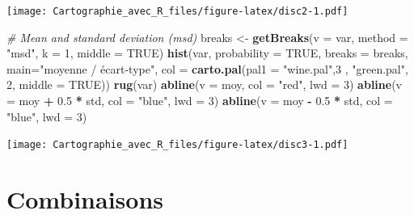 \documentclass[]{book}
\newenvironment{Shaded}{\begin{snugshade}}{\end{snugshade}}
\newcommand{\KeywordTok}[1]{\textcolor[rgb]{0.13,0.29,0.53}{\textbf{#1}}}
\newcommand{\DataTypeTok}[1]{\textcolor[rgb]{0.13,0.29,0.53}{#1}}
\newcommand{\DecValTok}[1]{\textcolor[rgb]{0.00,0.00,0.81}{#1}}
\newcommand{\FloatTok}[1]{\textcolor[rgb]{0.00,0.00,0.81}{#1}}
\newcommand{\StringTok}[1]{\textcolor[rgb]{0.31,0.60,0.02}{#1}}
\newcommand{\CommentTok}[1]{\textcolor[rgb]{0.56,0.35,0.01}{\textit{#1}}}
\newcommand{\OtherTok}[1]{\textcolor[rgb]{0.56,0.35,0.01}{#1}}
\newcommand{\OperatorTok}[1]{\textcolor[rgb]{0.81,0.36,0.00}{\textbf{#1}}}
\newcommand{\NormalTok}[1]{#1}
\begin{document}
\texttt{[image: Cartographie\_avec\_R\_files/figure-latex/disc2-1.pdf]}

\begin{Shaded}
\begin{Highlighting}[]
\CommentTok{# Mean and standard deviation (msd)}
\NormalTok{breaks <-}\StringTok{ }\KeywordTok{getBreaks}\NormalTok{(}\DataTypeTok{v =}\NormalTok{ var, }\DataTypeTok{method =} \StringTok{"msd"}\NormalTok{, }\DataTypeTok{k =} \DecValTok{1}\NormalTok{, }\DataTypeTok{middle =} \OtherTok{TRUE}\NormalTok{)}
\KeywordTok{hist}\NormalTok{(var, }\DataTypeTok{probability =} \OtherTok{TRUE}\NormalTok{, }\DataTypeTok{breaks =}\NormalTok{ breaks, }\DataTypeTok{main=}\StringTok{"moyenne / écart-type"}\NormalTok{,}
     \DataTypeTok{col =} \KeywordTok{carto.pal}\NormalTok{(}\DataTypeTok{pal1 =} \StringTok{"wine.pal"}\NormalTok{,}\DecValTok{3}\NormalTok{ , }\StringTok{"green.pal"}\NormalTok{, }\DecValTok{2}\NormalTok{, }\DataTypeTok{middle =} \OtherTok{TRUE}\NormalTok{))}
\KeywordTok{rug}\NormalTok{(var)}
\KeywordTok{abline}\NormalTok{(}\DataTypeTok{v =}\NormalTok{ moy, }\DataTypeTok{col =} \StringTok{"red"}\NormalTok{, }\DataTypeTok{lwd =} \DecValTok{3}\NormalTok{)}
\KeywordTok{abline}\NormalTok{(}\DataTypeTok{v =}\NormalTok{ moy }\OperatorTok{+}\StringTok{ }\FloatTok{0.5} \OperatorTok{*}\StringTok{ }\NormalTok{std, }\DataTypeTok{col =} \StringTok{"blue"}\NormalTok{, }\DataTypeTok{lwd =} \DecValTok{3}\NormalTok{)}
\KeywordTok{abline}\NormalTok{(}\DataTypeTok{v =}\NormalTok{ moy }\OperatorTok{-}\StringTok{ }\FloatTok{0.5} \OperatorTok{*}\StringTok{ }\NormalTok{std, }\DataTypeTok{col =} \StringTok{"blue"}\NormalTok{, }\DataTypeTok{lwd =} \DecValTok{3}\NormalTok{)}
\end{Highlighting}
\end{Shaded}

\texttt{[image: Cartographie\_avec\_R\_files/figure-latex/disc3-1.pdf]}

\section{Combinaisons}\label{combinaisons}
\end{document}
